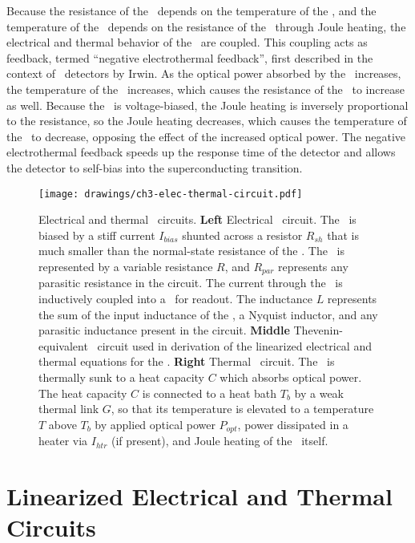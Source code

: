 Because the resistance of the \TES\ depends on the temperature of the \TES, and the temperature of the \TES\ depends on the resistance of the \TES\ through Joule heating, the electrical and thermal behavior of the \TES\ are coupled.
This coupling acts as feedback, termed ``negative electrothermal feedback'', first described in the context of \TES\ detectors by Irwin\cite{irwin_application_1995}.
As the optical power absorbed by the \TES\ increases, the temperature of the \TES\ increases, which causes the resistance of the \TES\ to increase as well.
Because the \TES\ is voltage-biased, the Joule heating is inversely proportional to the resistance, so the Joule heating decreases, which causes the temperature of the \TES\ to decrease, opposing the effect of the increased optical power.
The negative electrothermal feedback speeds up the response time of the detector and allows the detector to self-bias into the superconducting transition.

\begin{figure*}
\centering
\texttt{[image: drawings/ch3-elec-thermal-circuit.pdf]}
\caption[Electrical and thermal \TES\ circuits]{
Electrical and thermal \TES\ circuits.
\textbf{Left} Electrical \TES\ circuit.
The \TES\ is biased by a stiff current $I_{bias}$ shunted across a resistor $R_{sh}$ that is much smaller than the normal-state resistance of the \TES.
The \TES\ is represented by a variable resistance $R$, and $R_{par}$ represents any parasitic resistance in the circuit.
The current through the \TES\ is inductively coupled into a \SQUID\ for readout.
The inductance $L$ represents the sum of the input inductance of the \SQUID, a Nyquist inductor, and any parasitic inductance present in the circuit.
\textbf{Middle} Thevenin-equivalent \TES\ circuit used in derivation of the linearized electrical and thermal equations for the \TES.
\textbf{Right} Thermal \TES\ circuit.
The \TES\ is thermally sunk to a heat capacity $C$ which absorbs optical power.
The heat capacity $C$ is connected to a heat bath $T_b$ by a weak thermal link $G$, so that its temperature is elevated to a temperature $T$ above $T_b$ by applied optical power $P_{opt}$, power dissipated in a heater via $I_{htr}$ (if present), and Joule heating of the \TES\ itself.}
\label{fig:elec-thermal-circuit}
\end{figure*}

\section{Linearized Electrical and Thermal Circuits}\label{sec:lin-tes-eqn}

